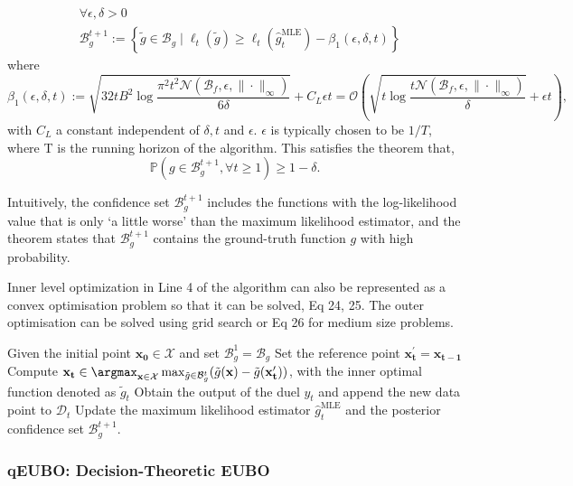 \documentclass[
  letterpaper,
  DIV=11,
  numbers=noendperiod,
  oneside]{scrreprt}
\theoremstyle{remark}
\begin{document}
\[\begin{aligned}
&\forall \epsilon, \delta > 0 \\
&\mathcal{B}_g^{t+1}:=\left\{\tilde{g} \in \mathcal{B}_g \mid \ell_t(\tilde{g}) \geq \ell_t\left(\hat{g}_t^{\mathrm{MLE}}\right)-\beta_1(\epsilon, \delta, t)\right\}
\end{aligned}\] where
\[\beta_1(\epsilon, \delta, t):=\sqrt{32 t B^2 \log \frac{\pi^2 t^2 \mathcal{N}\left(\mathcal{B}_f, \epsilon,\|\cdot\|_{\infty}\right)}{6 \delta}}+ C_L \epsilon t=\mathcal{O}\left(\sqrt{t \log \frac{t \mathcal{N}\left(\mathcal{B}_f, \epsilon,\|\cdot\|_{\infty}\right)}{\delta}}+\epsilon t\right),\]
with \(C_L\) a constant independent of \(\delta, t\) and \(\epsilon\).
\(\epsilon\) is typically chosen to be \(1 / T\), where T is the running
horizon of the algorithm. This satisfies the theorem that,
\[\mathbb{P}\left(g \in \mathcal{B}_g^{t+1}, \forall t \geq 1\right) \geq 1-\delta .\]

Intuitively, the confidence set \(\mathcal{B}_g^{t+1}\) includes the
functions with the log-likelihood value that is only `a little worse'
than the maximum likelihood estimator, and the theorem states that
\(\mathcal{B}_g^{t+1}\) contains the ground-truth function \(g\) with
high probability.

Inner level optimization in Line 4 of the algorithm can also be
represented as a convex optimisation problem so that it can be solved,
Eq 24, 25. The outer optimisation can be solved using grid search or Eq
26 for medium size problems.

Given the initial point \(\mathbf{x_0} \in \mathcal{X}\) and set
\(\mathcal{B}_g^1 = \mathcal{B}_g\) Set the reference point
\(\mathbf{x_t^{\prime}} = \mathbf{x_{t-1}}\) Compute
\(\mathbf{x_t} \in \argmax_{\mathbf{x} \in \mathcal{X}} \max_{\tilde{g} \in \mathcal{B}_g^t} (\tilde{g}(\mathbf{x}) - \tilde{g}(\mathbf{x_t^{\prime}}))\),
with the inner optimal function denoted as \(\tilde{g}_t\) Obtain the
output of the duel \(y_t\) and append the new data point to
\(\mathcal{D}_t\) Update the maximum likelihood estimator
\(\hat{g}_t^{\mathrm{MLE}}\) and the posterior confidence set
\(\mathcal{B}_g^{t+1}\).

\subsubsection*{qEUBO: Decision-Theoretic
EUBO}\label{qeubo-decision-theoretic-eubo}
\end{document}
